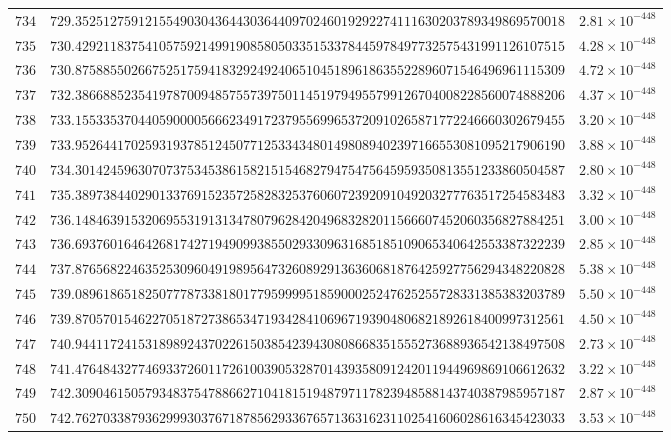\documentclass[12pt,reqno]{amsart}
\theoremstyle{remark}
\begin{document}
\begin{longtable}{clc}
$734$ & $729.3525127591215549030436443036440970246019292274111630203789349869570018$ & $2.81\times 10^{-448}$ \\
$735$ & $730.4292118375410575921499190858050335153378445978497732575431991126107515$ & $4.28\times 10^{-448}$ \\
$736$ & $730.8758855026675251759418329249240651045189618635522896071546496961115309$ & $4.72\times 10^{-448}$ \\
$737$ & $732.3866885235419787009485755739750114519794955799126704008228560074888206$ & $4.37\times 10^{-448}$ \\
$738$ & $733.1553353704405900005666234917237955699653720910265871772246660302679455$ & $3.20\times 10^{-448}$ \\
$739$ & $733.9526441702593193785124507712533434801498089402397166553081095217906190$ & $3.88\times 10^{-448}$ \\
$740$ & $734.3014245963070737534538615821515468279475475645959350813551233860504587$ & $2.80\times 10^{-448}$ \\
$741$ & $735.3897384402901337691523572582832537606072392091049203277763517254583483$ & $3.32\times 10^{-448}$ \\
$742$ & $736.1484639153206955319131347807962842049683282011566607452060356827884251$ & $3.00\times 10^{-448}$ \\
$743$ & $736.6937601646426817427194909938550293309631685185109065340642553387322239$ & $2.85\times 10^{-448}$ \\
$744$ & $737.8765682246352530960491989564732608929136360681876425927756294348220828$ & $5.38\times 10^{-448}$ \\
$745$ & $739.0896186518250777873381801779599995185900025247625255728331385383203789$ & $5.50\times 10^{-448}$ \\
$746$ & $739.8705701546227051872738653471934284106967193904806821892618400997312561$ & $4.50\times 10^{-448}$ \\
$747$ & $740.9441172415318989243702261503854239430808668351555273688936542138497508$ & $2.73\times 10^{-448}$ \\
$748$ & $741.4764843277469337260117261003905328701439358091242011944969869106612632$ & $3.22\times 10^{-448}$ \\
$749$ & $742.3090461505793483754788662710418151948797117823948588143740387985957187$ & $2.87\times 10^{-448}$ \\
$750$ & $742.7627033879362999303767187856293367657136316231102541606028616345423033$ & $3.53\times 10^{-448}$ \\

\end{longtable}
\end{document}
